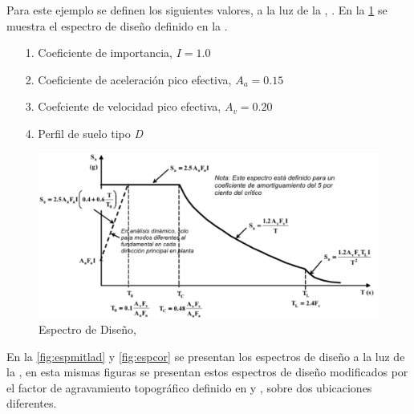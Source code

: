 \documentclass[spanish,letterpaper,12pt,twoside,openany]{article}
\begin{document}
%
Para este ejemplo se definen los siguientes valores, a la luz de la \citeauthor{NSR-10}, \citeyear{NSR-10}. En la \cref{fig:nsr10} se muestra el espectro de diseño definido en la \citeauthor{NSR-10}.
%
\begin{itemize}
%
	\item[1.] Coeficiente de importancia, $I=1.0$ \vspace{-.5 cm}
	\item[2.] Coeficiente de aceleración pico efectiva, $A_a=0.15$\vspace{-.5 cm}
	\item[3.] Coefciente de velocidad pico efectiva, $A_v=0.20$\vspace{-.5 cm}
	\item[4.] Perfil de suelo tipo \textit{D}
%
\end{itemize}
%
\begin{figure}[H]
	\centering
	\includegraphics[width=12 cm]{img/EspectroNSR10.pdf}
	\caption{Espectro de Diseño, \citep[][Figura A.2.6-1]{NSR-10}}
	\label{fig:nsr10}
\end{figure}

%
En la \cref{fig:espmitlad} y \cref{fig:espcor} se presentan los espectros de diseño a la luz de la \citeauthor{NSR-10} \citeyear{NSR-10}, en esta mismas figuras se presentan estos espectros de diseño modificados por el factor de agravamiento topográfico definido en \citeauthor{AFPS1995} y \citeauthor{EC8}, sobre dos ubicaciones diferentes.
\end{document}
